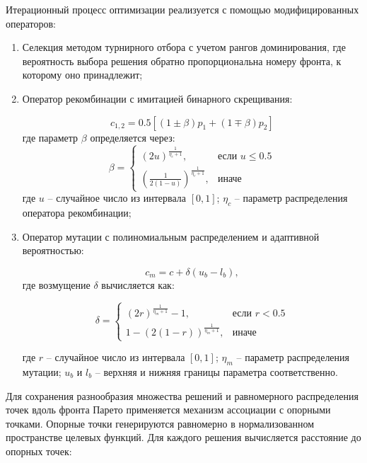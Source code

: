 Итерационный процесс оптимизации реализуется с помощью модифицированных операторов:

\begin{enumerate}
\item Селекция методом турнирного отбора с учетом рангов доминирования, где вероятность выбора решения обратно пропорциональна номеру фронта, к которому оно принадлежит;

\item Оператор рекомбинации с имитацией бинарного скрещивания:

\begin{equation}
c_{1,2} = 0.5[(1 \pm \beta)p_1 + (1 \mp \beta)p_2]
\end{equation}
где параметр $\beta$ определяется через:
\begin{equation}
\beta = \begin{cases}
(2u)^{\frac{1}{\eta_c + 1}}, & \text{если } u \leq 0.5 \\
(\frac{1}{2(1-u)})^{\frac{1}{\eta_c + 1}}, & \text{иначе}
\end{cases}
\end{equation}
где $u$ -- случайное число из интервала $[0,1]$;
$\eta_c$ -- параметр распределения оператора рекомбинации;

\item Оператор мутации с полиномиальным распределением и адаптивной вероятностью:

\begin{equation}
c_m = c + \delta(u_b - l_b),
\end{equation}
где возмущение $\delta$ вычисляется как:

\begin{equation}
\delta = \begin{cases}
(2r)^{\frac{1}{\eta_m + 1}} - 1, & \text{если } r < 0.5 \\
1 - (2(1-r))^{\frac{1}{\eta_m + 1}}, & \text{иначе}
\end{cases}
\end{equation}

где $r$ -- случайное число из интервала $[0,1]$;
$\eta_m$ -- параметр распределения мутации;
$u_b$ и $l_b$ -- верхняя и нижняя границы параметра соответственно.
\end{enumerate}

Для сохранения разнообразия множества решений и равномерного распределения точек вдоль фронта Парето
применяется механизм ассоциации с опорными точками. Опорные
точки генерируются равномерно в нормализованном
пространстве целевых функций. Для каждого решения вычисляется расстояние до опорных точек:

